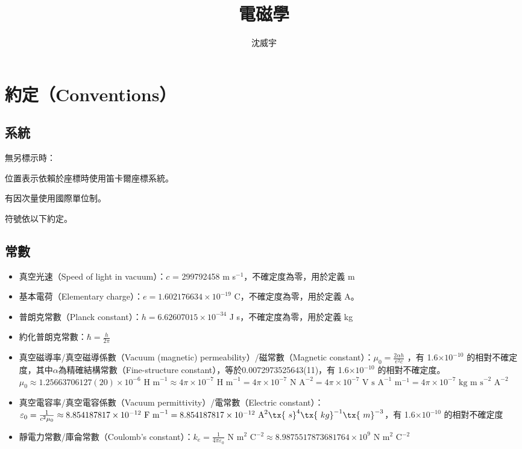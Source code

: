 \documentclass[a4paper,12pt]{report}
\begin{document}
\title{電磁學}
\author{沈威宇}
\date{\temtoday}
\titletocdoc
{}


\section{約定（Conventions）}
\subsection{系統}
無另標示時：
\bit
\item 位置表示依賴於座標時使用笛卡爾座標系統。
\item 有因次量使用國際單位制。
\item 符號依以下約定。
\eit
\subsection{常數}
\begin{itemize}
\item 真空光速（Speed of light in vacuum）：$c$ = 299792458 m s$^{-1}$，不確定度為零，用於定義 m
\item 基本電荷（Elementary charge）：$e = 1.602176634 \times 10^{-19}$ C，不確定度為零，用於定義 A。
\item 普朗克常數（Planck constant）：$h = 6.62607015 \times 10^{-34}$ J s，不確定度為零，用於定義 kg
\item 約化普朗克常數：$\hbar=\frac{h}{2\pi}$
\item 真空磁導率/真空磁導係數（Vacuum (magnetic) permeability）/磁常數（Magnetic constant）：$\mu_0 = \frac{2\alpha h}{e^2c}$ ，有 1.6$\times 10^{-10}$ 的相對不確定度，其中$\alpha$為精確結構常數（Fine-structure constant），等於0.0072973525643(11)，有 1.6$\times 10^{-10}$ 的相對不確定度。$\mu_0\approx 1.25663706127(20)\times 10^{-6}\text{\ H m}^{-1}\approx 4\pi\times 10^{-7} \text{\ H m}^{-1} = 4\pi\times 10^{-7} \text{\ N A}^{-2} = 4\pi\times 10^{-7} \text{\ V s A}^{-1} \text{\ m}^{-1}  = 4\pi\times 10^{-7} \text{\ kg m s}^{-2} \text{\ A}^{-2}$ 
\item 真空電容率/真空電容係數（Vacuum permittivity）/電常數（Electric constant）：$\varepsilon_0 = \frac{1}{c^2\mu_0} \approx 8.854187817 \times 10^{-12} \text{\ F m}^{-1} = 8.854187817 \times 10^{-12} \text{\ A}^2\tx{\ s}^4\tx{\ kg}^{-1}\tx{\ m}^{-3}$，有 1.6$\times 10^{-10}$ 的相對不確定度
\item 靜電力常數/庫侖常數（Coulomb's constant）：$k_e = \frac{1}{4\pi\varepsilon_0}$ N m$^2$ C$^{-2} \approx 8.9875517873681764 \times 10^{9}$ N m$^2$ C$^{-2}$
\end{itemize}
\end{document}
